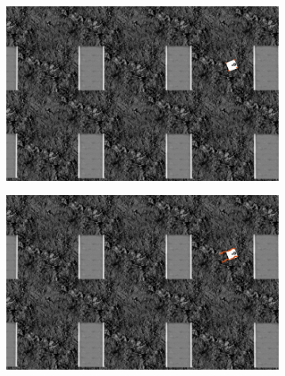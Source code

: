 \begin{figure}[!htbp]
    \begin{subfigure}[b]{0.45\textwidth}
        \includegraphics[width=\textwidth]{img/18741_optical_flow.png}\label{fig:optical1}
                \caption{}
   \end{subfigure}  \hfill
    \begin{subfigure}[b]{0.45\textwidth}
        \includegraphics[width=\textwidth]{img/18800_optical_flow.png}\label{fig:optical4}
                \caption{}
   \end{subfigure}
   

\end{figure}

